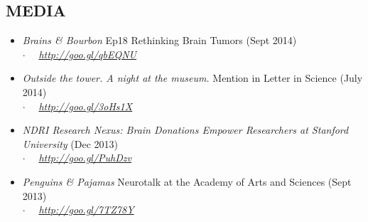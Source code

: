 \documentclass[line,margin]{res}
\newcommand{\placestyle}[1]{\footnotesize $\cdot$\ \ {\emph{#1}}}
\newcommand{\datestyle}[1]{{\tiny \dotfill} {\small (#1)}}
\begin{document}
\begin{resume}
\section{MEDIA}
\begin{itemize}
\item \emph{Brains \& Bourbon} Ep18 Rethinking Brain Tumors \datestyle{Sept 2014} \\
  {\placestyle{ \url{http://goo.gl/qbEQNU}}}
\item \emph{Outside the tower. A night at the museum.} Mention in Letter in Science \datestyle{July 2014} \\
  {\placestyle{ \url{http://goo.gl/3oHs1X}}}
\item \emph{NDRI Research Nexus: Brain Donations Empower Researchers at Stanford University} \datestyle{Dec 2013}\\
  {\placestyle{ \url{http://goo.gl/PuhDzv}}}
\item \emph{Penguins \& Pajamas} Neurotalk at the Academy of Arts and Sciences \datestyle{Sept 2013} \\
  {\placestyle{ \url{http://goo.gl/7TZ78Y}}}
\end{itemize}


\end{resume}
\end{document}
